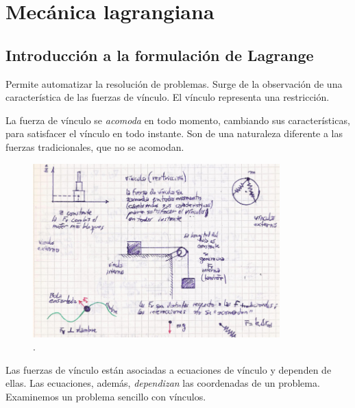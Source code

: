 \documentclass[10pt,oneside]{CBFT_book}
\begin{document}
\chapter{Mecánica lagrangiana}


\section{Introducción a la formulación de Lagrange}

Permite automatizar la resolución de problemas. Surge de la observación de una característica de las fuerzas de vínculo.
El vínculo representa una restricción.

La fuerza de vínculo se {\it acomoda} en todo momento, cambiando sus características, para satisfacer el vínculo en
todo instante. Son de una naturaleza diferente a las fuerzas tradicionales, que no se acomodan.

\begin{figure}[!ht]
	\includegraphics[width=0.85\textwidth]{images/fig_mc_vinculos_varios.jpg}
	\caption{.}
	\label{fig_mc_vinculos_varios}
\end{figure}

Las fuerzas de vínculo están asociadas a ecuaciones de vínculo y dependen de ellas. Las ecuaciones, además, {\it
dependizan} las coordenadas de un problema. Examinemos un problema sencillo con vínculos.
\end{document}
